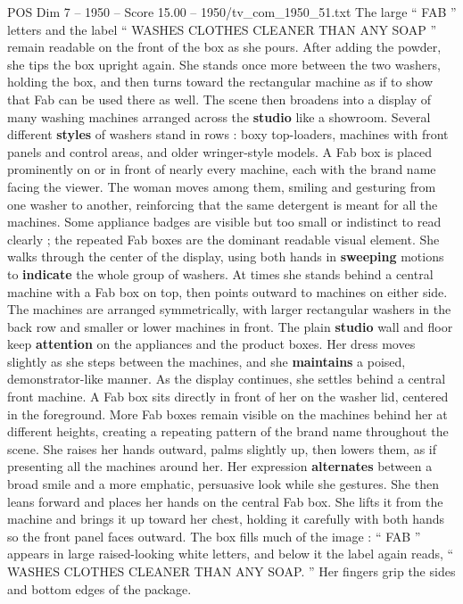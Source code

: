 \begin{textsample}{POS Dim 7 – 1950 – Score 15.00 – 1950/tv\_com\_1950\_51.txt}
The large “ FAB ” letters and the label “ WASHES CLOTHES CLEANER THAN ANY SOAP ” remain readable on the front of the box as she pours.
After adding the powder, she tips the box upright again.
She stands once more between the two washers, holding the box, and then turns toward the rectangular machine as if to show that Fab can be used there as well.
The scene then broadens into a display of many washing machines arranged across the \textbf{studio} like a showroom.
Several different \textbf{styles} of washers stand in rows : boxy top-loaders, machines with front panels and control areas, and older wringer-style models.
A Fab box is placed prominently on or in front of nearly every machine, each with the brand name facing the viewer.
The woman moves among them, smiling and gesturing from one washer to another, reinforcing that the same detergent is meant for all the machines.
Some appliance badges are visible but too small or indistinct to read clearly ; the repeated Fab boxes are the dominant readable visual element.
She walks through the center of the display, using both hands in \textbf{sweeping} motions to \textbf{indicate} the whole group of washers.
At times she stands behind a central machine with a Fab box on top, then points outward to machines on either side.
The machines are arranged symmetrically, with larger rectangular washers in the back row and smaller or lower machines in front.
The plain \textbf{studio} wall and floor keep \textbf{attention} on the appliances and the product boxes.
Her dress moves slightly as she steps between the machines, and she \textbf{maintains} a poised, demonstrator-like manner.
As the display continues, she settles behind a central front machine.
A Fab box sits directly in front of her on the washer lid, centered in the foreground.
More Fab boxes remain visible on the machines behind her at different heights, creating a repeating pattern of the brand name throughout the scene.
She raises her hands outward, palms slightly up, then lowers them, as if presenting all the machines around her.
Her expression \textbf{alternates} between a broad smile and a more emphatic, persuasive look while she gestures.
She then leans forward and places her hands on the central Fab box.
She lifts it from the machine and brings it up toward her chest, holding it carefully with both hands so the front panel faces outward.
The box fills much of the image : “ FAB ” appears in large raised-looking white letters, and below it the label again reads, “ WASHES CLOTHES CLEANER THAN ANY SOAP. ” Her fingers grip the sides and bottom edges of the package.

\end{textsample}
